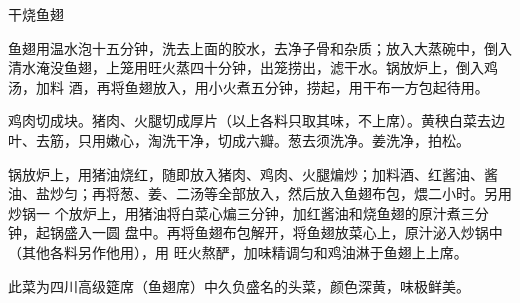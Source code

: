 \begin{recipe}{干烧鱼翅}

\ingredients


\preparation

\step 鱼翅用温水泡十五分钟，洗去上面的胶水，去净子骨和杂质；放入大蒸碗中，倒入
清水淹没鱼翅，上笼用旺火蒸四十分钟，出笼捞出，滤干水。锅放炉上，倒入鸡汤，加料
酒，再将鱼翅放入，用小火煮五分钟，捞起，用干布一方包起待用。

\step 鸡肉切成块。猪肉、火腿切成厚片（以上各料只取其味，不上席）。黄秧白菜去边
叶、去筋，只用嫩心，淘洗干净，切成六瓣。葱去须洗净。姜洗净，拍松。

\step 锅放炉上，用猪油烧红，随即放入猪肉、鸡肉、火腿煸炒；加料酒、红酱油、酱
油、盐炒匀；再将葱、姜、二汤等全部放入，然后放入鱼翅布包，煨二小时。另用炒锅一
个放炉上，用猪油将白菜心煸三分钟，加红酱油和烧鱼翅的原汁煮三分钟，起锅盛入一圆
盘中。再将鱼翅布包解开，将鱼翅放菜心上，原汁泌入炒锅中（其他各料另作他用），用
旺火熬酽，加味精调匀和鸡油淋于鱼翅上上席。

\features

此菜为四川高级筵席（鱼翅席）中久负盛名的头菜，颜色深黄，味极鲜美。

\end{recipe}

